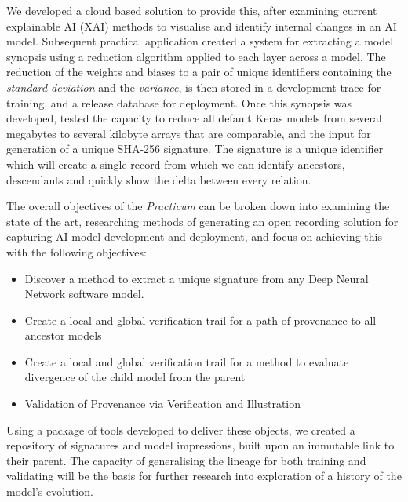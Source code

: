 We developed a cloud based solution to provide this, after examining current explainable AI (XAI) methods to visualise and identify internal changes in an AI model. Subsequent practical application created a system for extracting a model synopsis using a reduction algorithm applied to each layer across a model. The reduction of the weights and biases to a pair of unique identifiers containing the \textit{standard deviation} and the \textit{variance}, is then stored in a development trace for training, and a release database for deployment. Once this synopsis was developed, tested the capacity to reduce all default Keras models from several megabytes to several kilobyte arrays that are comparable, and the input for generation of a unique SHA-256 signature. The signature is a unique identifier which will create a single record from which we can identify ancestors, descendants and quickly show the delta between every relation.

The overall objectives of the \textit{Practicum} can be broken down into examining the state of the art, researching methods of generating an open recording solution for capturing AI model development and deployment, and focus on achieving this with the following objectives:

\begin{itemize}
    \item Discover a method to extract a unique signature from any Deep Neural Network software model.
    \item Create a local and global verification trail for a path of provenance to all ancestor models
    \item Create a local and global verification trail for a method to evaluate divergence of the child model from the parent
    \item Validation of Provenance via Verification and Illustration
\end{itemize}

Using a package of tools developed to deliver these objects, we created a repository of signatures and model impressions, built upon an immutable link to their parent. The capacity of generalising the lineage for both training and validating will be the basis for further research into exploration of a history of the model's evolution.